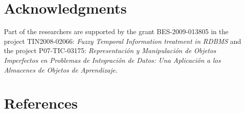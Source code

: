 \documentclass[11pt,twoside]{article}
\def\labart{yourLabel}      %
\begin{document}
\begin{multicols}{2}
%
%
%
%
%

\section*{Acknowledgments}
Part of the researchers are supported by the grant BES-2009-013805 in the project TIN2008-02066: \emph{Fuzzy Temporal Information treatment in RDBMS} and  the project P07-TIC-03175: \emph{Representaci\'on y Manipulaci\'on de Objetos Imperfectos en Problemas de Integraci\'on de Datos: Una Aplicaci\'on a los Almacenes de Objetos de Aprendizaje}.





\section*{References}



\end{multicols}
\end{document}
